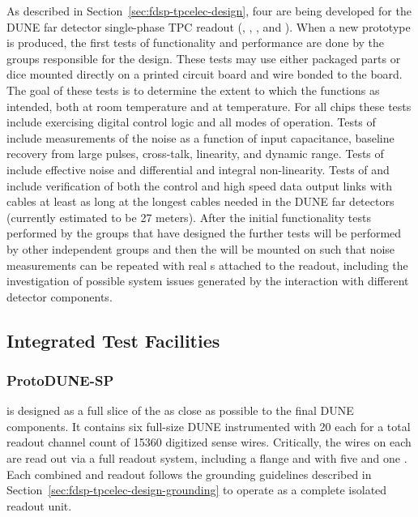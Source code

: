 As described in Section~\ref{sec:fdsp-tpcelec-design}, four  
are being developed for the DUNE far detector single-phase TPC readout 
(, , , and ). 
When a new prototype  is produced, the first tests of 
 functionality and performance are done by the groups 
responsible for the  design. These tests may use either 
packaged parts or dice mounted directly on a printed circuit board 
and wire bonded to the board.  The goal of these tests is to determine 
the extent to which the  functions as intended, both at room 
temperature and at \lntwo temperature.  For all chips these tests 
include exercising digital control logic and all modes of operation. Tests 
of   include measurements of the noise as a function 
of input capacitance, baseline recovery from large pulses, cross-talk, linearity, 
and dynamic range. Tests of  include effective noise and 
differential and integral non-linearity. Tests of  and  
include verification of both the control and high speed data output links with 
cables at least as long at the longest cables needed in the DUNE far detectors 
(currently estimated to be 27 meters). After the initial functionality
tests performed by the groups that have designed the  further
tests will be performed by other independent groups and then the 
will be mounted on  such that noise measurements can be repeated
with real s attached to the readout, including the investigation
of possible system issues generated by the interaction with different 
detector components.

\subsection{Integrated Test Facilities}
\label{sec:fdsp-tpcelec-qa-facilities}

\subsubsection{ProtoDUNE-SP}
\label{sec:fdsp-tpcelec-qa-facilities-pdune}

 is designed as a full slice of the  as close as 
possible to the final DUNE \single components. It contains six full-size 
DUNE  instrumented with \num{20}  each for a 
total readout channel count of \num{15360} digitized sense wires. Critically, 
the wires on each  are read out via a full  readout 
system, including a  flange and  with five  
and one . Each combined  and  readout follows 
the grounding guidelines described in Section~\ref{sec:fdsp-tpcelec-design-grounding} 
to operate as a complete isolated readout unit.

